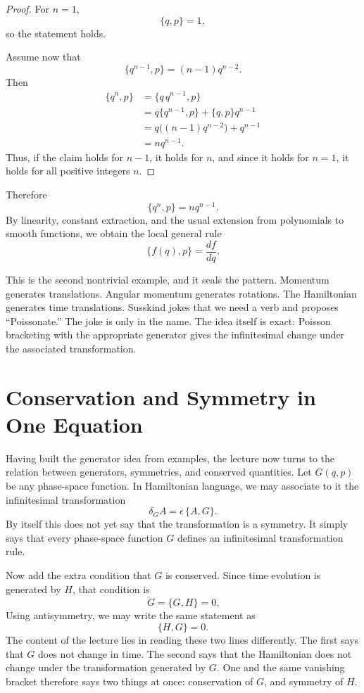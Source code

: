 \begin{proof}
For \(n=1\),
\[
\{q,p\}=1,
\]
so the statement holds.

Assume now that
\[
\{q^{n-1},p\}=(n-1)q^{n-2}.
\]
Then
\begin{align}
\{q^n,p\}
&=\{q\,q^{n-1},p\}\\
&=q\{q^{n-1},p\}+\{q,p\}q^{n-1}\\
&=q\bigl((n-1)q^{n-2}\bigr)+q^{n-1}\\
&=nq^{n-1}.
\end{align}
Thus, if the claim holds for \(n-1\), it holds for \(n\), and since it holds for \(n=1\), it holds for all positive integers \(n\).
\end{proof}

Therefore
\begin{equation}
\{q^n,p\}=nq^{n-1}.
\end{equation}
By linearity, constant extraction, and the usual extension from polynomials to smooth functions, we obtain the local general rule
\begin{equation}
\{f(q),p\}=\frac{df}{dq}.
\end{equation}

This is the second nontrivial example, and it seals the pattern. Momentum generates translations. Angular momentum generates rotations. The Hamiltonian generates time translations. Susskind jokes that we need a verb and proposes ``Poissonate.'' The joke is only in the name. The idea itself is exact: Poisson bracketing with the appropriate generator gives the infinitesimal change under the associated transformation.

\section{Conservation and Symmetry in One Equation}

Having built the generator idea from examples, the lecture now turns to the relation between generators, symmetries, and conserved quantities. Let \(G(q,p)\) be any phase-space function. In Hamiltonian language, we may associate to it the infinitesimal transformation
\begin{equation}
\delta_G A=\epsilon\,\{A,G\}.
\end{equation}
By itself this does not yet say that the transformation is a symmetry. It simply says that every phase-space function \(G\) defines an infinitesimal transformation rule.

Now add the extra condition that \(G\) is conserved. Since time evolution is generated by \(H\), that condition is
\begin{equation}
\dot G=\{G,H\}=0.
\end{equation}
Using antisymmetry, we may write the same statement as
\begin{equation}
\{H,G\}=0.
\end{equation}
The content of the lecture lies in reading these two lines differently. The first says that \(G\) does not change in time. The second says that the Hamiltonian does not change under the transformation generated by \(G\). One and the same vanishing bracket therefore says two things at once: conservation of \(G\), and symmetry of \(H\).

